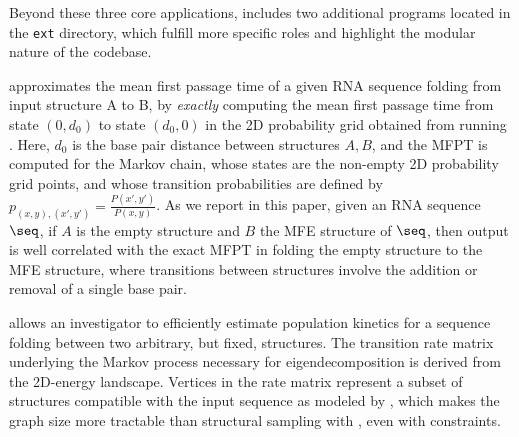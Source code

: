 Beyond these three core applications, \hermes includes two
additional programs located in the {\tt ext} directory, which fulfill
more specific roles and highlight the modular nature of the codebase.

\fftmfpt approximates the mean first passage time of a given RNA
sequence folding from input structure A to B, by {\em exactly}
computing the mean first passage time from state $(0,d_0)$ to state
$(d_0,0)$ in the 2D probability grid obtained from running
\ffttwo. Here, $d_0$ is the base pair distance between structures
$A,B$, and the MFPT is computed for the Markov chain, whose states are
the non-empty 2D probability grid points, and whose transition
probabilities are defined by $p_{(x,y),(x',y')} =
\frac{P(x',y')}{P(x,y)}$. As we report in this paper, given an RNA
sequence $\seq$, if $A$ is the empty structure and $B$ the MFE
structure of $\seq$, then \fftmfpt output is well correlated with the
exact MFPT in folding the empty structure to the MFE structure, where
transitions between structures involve the addition or removal of a
single base pair.

\ffteq allows an investigator to efficiently estimate population
kinetics for a sequence folding between two arbitrary, but fixed,
structures. The transition rate matrix underlying the Markov process
necessary for eigendecomposition is derived from the 2D-energy
landscape. Vertices in the rate matrix represent a subset of
structures compatible with the input sequence as modeled by
\ffttwo, which makes the graph size more tractable than structural
sampling with \rnasub, even with constraints.



